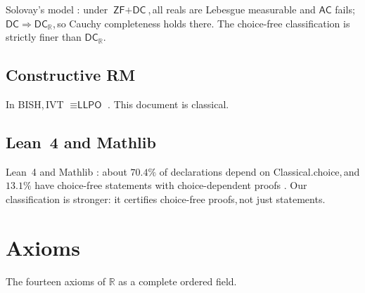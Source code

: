 \documentclass[11pt,reqno]{amsart}
\providecommand{\R}{\mathbb{R}}
\newcommand{\comma}{,\,\allowbreak}
\theoremstyle{redplain}
\begin{document}
Solovay's model \cite{Solovay1970}: under $\textsf{ZF}+\textsf{DC}$\comma all reals are Lebesgue measurable and $\textsf{AC}$ fails; $\textsf{DC}\Rightarrow\textsf{DC}_\R$\comma so Cauchy completeness holds there. The choice-free classification is strictly finer than $\textsf{DC}_\R$.

\subsection{Constructive RM}

In BISH\comma IVT $\equiv\textsf{LLPO}$ \cite{Bridges2023}. This document is classical.

\subsection{Lean~4 and Mathlib}

Lean~4 and Mathlib \cite{Lean4}: about $70.4\%$ of declarations depend on \textsf{Classical.choice}\comma and $13.1\%$ have choice-free statements with choice-dependent proofs \cite{Crossref2026}. Our classification is stronger: it certifies choice-free proofs\comma not just statements.

\section{Axioms}
\label{sec:axioms}

\noindent The fourteen axioms of $\R$ as a complete ordered field.

\medskip
\end{document}
